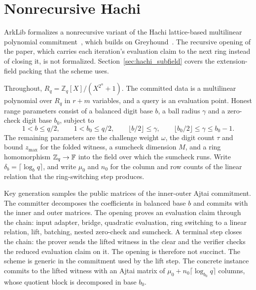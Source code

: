 
\section{Nonrecursive Hachi}\label{sec:hachi_nonrecursive}

ArkLib formalizes a nonrecursive variant of the Hachi lattice-based multilinear polynomial
commitment~\cite{NOZ26}, which builds on Greyhound~\cite{NS24}. The recursive opening of the
paper, which carries each iteration's evaluation claim to the next ring instead of closing
it, is not formalized. Section~\ref{sec:hachi_subfield} covers the extension-field packing
that the scheme uses.

Throughout, $R_q=\mathbb{Z}_q[X]/(X^{2^\alpha}+1)$. The committed data is a multilinear
polynomial over $R_q$ in $r+m$ variables, and a query is an evaluation point. Honest range
parameters consist of a balanced digit base $b$, a ball radius $\gamma$ and a zero-check
digit base $b_0$, subject to
\[
  1<b\leq q/2,\qquad 1<b_0\leq q/2,\qquad
  \lfloor b/2\rfloor\leq\gamma,\qquad \lfloor b_0/2\rfloor\leq\gamma\leq b_0-1.
\]
The remaining parameters are the challenge weight $\omega$, the digit count $\tau$ and
bound $z_{\max}$ for the folded witness, a sumcheck dimension $M$, and a ring homomorphism
$\mathbb{Z}_q\to\mathbb{F}$ into the field over which the sumcheck runs. Write
$\delta_b=\lceil\log_b q\rceil$, and write $\mu_0$ and $n_0$ for the column and row counts
of the linear relation that the ring-switching step produces.

\begin{definition}\label{def:hachi_nonrecursive}
\leanok
Key generation samples the public matrices of the inner-outer Ajtai commitment. The committer
decomposes the coefficients in balanced base $b$ and commits with the inner and outer
matrices. The opening proves an evaluation claim through the chain: input adapter, bridge,
quadratic evaluation, ring switching to a linear relation, lift, batching, nested zero-check
and sumcheck. A terminal step closes the chain: the prover sends the lifted witness in the
clear and the verifier checks the reduced evaluation claim on it. The opening is therefore
not succinct. The scheme is generic in the commitment used by the lift step. The concrete
instance commits to the lifted witness with an Ajtai matrix of $\mu_0+n_0\lceil\log_{b_0}q\rceil$
columns, whose quotient block is decomposed in base $b_0$.
\end{definition}

